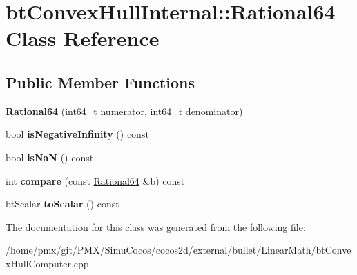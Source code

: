 \hypertarget{classbtConvexHullInternal_1_1Rational64}{}\section{bt\+Convex\+Hull\+Internal\+:\+:Rational64 Class Reference}
\label{classbtConvexHullInternal_1_1Rational64}
\subsection*{Public Member Functions}
\begin{DoxyCompactItemize}
\item 
\mbox{\label{classbtConvexHullInternal_1_1Rational64_ae9dd2a4ba5462ae2ab320ba7c1fb18c9}} 
{\bfseries Rational64} (int64\+\_\+t numerator, int64\+\_\+t denominator)
\item 
\mbox{\label{classbtConvexHullInternal_1_1Rational64_a4eb1cb1de1411a011ceef42bc733fb3c}} 
bool {\bfseries is\+Negative\+Infinity} () const
\item 
\mbox{\label{classbtConvexHullInternal_1_1Rational64_a2135d0b195c7b3a1ebe32d53cc5db4cd}} 
bool {\bfseries is\+NaN} () const
\item 
\mbox{\label{classbtConvexHullInternal_1_1Rational64_adc86c7bdd0dbcb4e213630f96254e33c}} 
int {\bfseries compare} (const \hyperlink{classbtConvexHullInternal_1_1Rational64}{Rational64} \&b) const
\item 
\mbox{\label{classbtConvexHullInternal_1_1Rational64_a8d0cc3b5bcb5d8ab6a22be895c0e4836}} 
bt\+Scalar {\bfseries to\+Scalar} () const
\end{DoxyCompactItemize}


The documentation for this class was generated from the following file\+:\begin{DoxyCompactItemize}
\item 
/home/pmx/git/\+P\+M\+X/\+Simu\+Cocos/cocos2d/external/bullet/\+Linear\+Math/bt\+Convex\+Hull\+Computer.\+cpp\end{DoxyCompactItemize}
